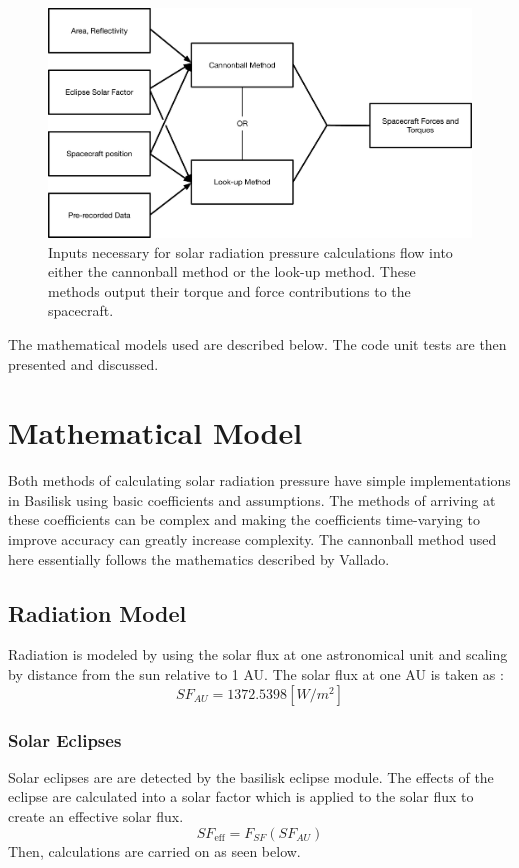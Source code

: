 \documentclass[]{BasiliskReportMemo}
\begin{document}
\begin{figure}[H]
\centering \includegraphics[height=0.5\textwidth, keepaspectratio]{Figures/codeFlow.pdf}
\caption{Inputs necessary for solar radiation pressure calculations flow into either the cannonball method or the look-up method. These methods output their torque and force contributions to the spacecraft.}
\label{img:codeFlow}
\end{figure}

The mathematical models used are described below. The code unit tests are then presented and discussed.



\section{Mathematical Model}
Both methods of calculating solar radiation pressure have simple implementations in Basilisk using basic coefficients and assumptions. The methods of arriving at these coefficients can be complex and making the coefficients time-varying to improve accuracy can greatly increase complexity. The cannonball method used here essentially follows the mathematics described by Vallado.
\subsection{Radiation Model}
Radiation is modeled by using the solar flux at one astronomical unit and scaling by distance from the sun relative to 1 AU. The solar flux at one AU is taken as :
\begin{equation}
SF_{AU} = 1372.5398    [W/m^2]
\end{equation}
\subsubsection{Solar Eclipses}
Solar eclipses are are detected by the basilisk eclipse module. The effects of the eclipse are calculated into a solar factor which is applied to the solar flux to create an effective solar flux. 
\begin{equation}
SF_{\mathrm{eff}} = F_{SF} (SF_{AU})
\end{equation}
Then, calculations are carried on as seen below.
\end{document}
